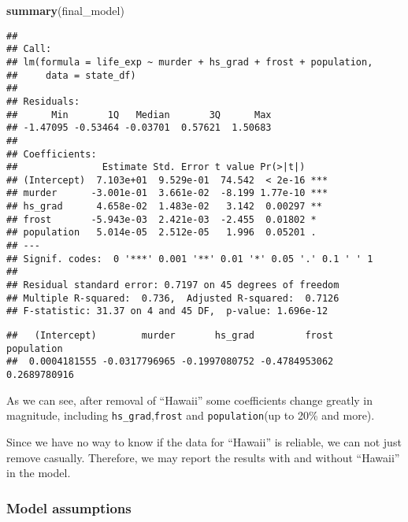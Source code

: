 \documentclass[]{article}
\newenvironment{Shaded}{\begin{snugshade}}{\end{snugshade}}
\newcommand{\KeywordTok}[1]{\textcolor[rgb]{0.13,0.29,0.53}{\textbf{#1}}}
\newcommand{\NormalTok}[1]{#1}
\newcommand{\OperatorTok}[1]{\textcolor[rgb]{0.81,0.36,0.00}{\textbf{#1}}}
\begin{document}
\begin{Shaded}
\begin{Highlighting}[]
\KeywordTok{summary}\NormalTok{(final_model)}
\end{Highlighting}
\end{Shaded}

\begin{verbatim}
## 
## Call:
## lm(formula = life_exp ~ murder + hs_grad + frost + population, 
##     data = state_df)
## 
## Residuals:
##      Min       1Q   Median       3Q      Max 
## -1.47095 -0.53464 -0.03701  0.57621  1.50683 
## 
## Coefficients:
##               Estimate Std. Error t value Pr(>|t|)    
## (Intercept)  7.103e+01  9.529e-01  74.542  < 2e-16 ***
## murder      -3.001e-01  3.661e-02  -8.199 1.77e-10 ***
## hs_grad      4.658e-02  1.483e-02   3.142  0.00297 ** 
## frost       -5.943e-03  2.421e-03  -2.455  0.01802 *  
## population   5.014e-05  2.512e-05   1.996  0.05201 .  
## ---
## Signif. codes:  0 '***' 0.001 '**' 0.01 '*' 0.05 '.' 0.1 ' ' 1
## 
## Residual standard error: 0.7197 on 45 degrees of freedom
## Multiple R-squared:  0.736,  Adjusted R-squared:  0.7126 
## F-statistic: 31.37 on 4 and 45 DF,  p-value: 1.696e-12
\end{verbatim}

\begin{Shaded}
\end{Shaded}

\begin{verbatim}
##   (Intercept)        murder       hs_grad         frost    population 
##  0.0004181555 -0.0317796965 -0.1997080752 -0.4784953062  0.2689780916
\end{verbatim}

As we can see, after removal of ``Hawaii'' some coefficients change
greatly in magnitude, including \texttt{hs\_grad},\texttt{frost} and
\texttt{population}(up to 20\% and more).

Since we have no way to know if the data for ``Hawaii'' is reliable, we
can not just remove casually. Therefore, we may report the results with
and without ``Hawaii'' in the model.

\hypertarget{model-assumptions}{%
\subsubsection{Model assumptions}\label{model-assumptions}}
\end{document}
